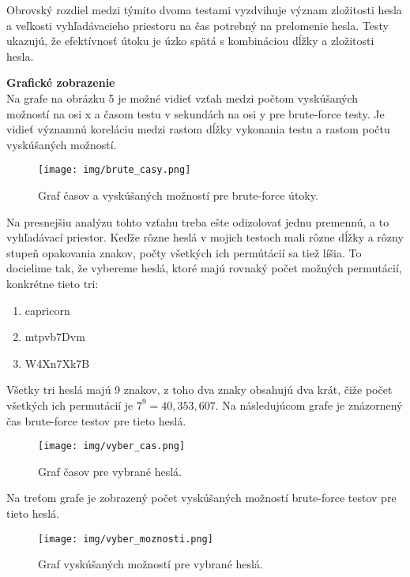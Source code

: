 \documentclass[12pt, twoside]{book}
\newcommand{\subsubsubsection}[1]{%
  \textbf{#1} \\ 
}
\begin{document}
Obrovský rozdiel medzi týmito dvoma testami vyzdvihuje význam zložitosti hesla a veľkosti vyhľadávacieho priestoru na čas potrebný na prelomenie hesla. Testy ukazujú, že efektívnosť útoku je úzko spätá s kombináciou dĺžky a zložitosti hesla. 

\subsubsubsection{Grafické zobrazenie}
Na grafe na obrázku 5 je možné vidieť vzťah medzi počtom vyskúšaných možností na osi x a časom testu v sekundách na osi y pre brute-force testy. Je vidieť významnú koreláciu medzi rastom dĺžky vykonania testu a rastom počtu vyskúšaných možností.

\begin{figure}[H] 
    \centering
    \texttt{[image: img/brute\_casy.png]}
    \caption{Graf časov a vyskúšaných možností pre brute-force útoky.}
    \label{fig:brute_casy}
\end{figure}

Na presnejšiu analýzu tohto vzťahu treba ešte odizolovať jednu premennú, a to vyhľadávací priestor. Keďže rôzne heslá v mojich testoch mali rôzne dĺžky a rôzny stupeň opakovania znakov, počty všetkých ich permútácií sa tiež líšia. To docielime tak, že vybereme heslá, ktoré majú rovnaký počet možných permutácií, konkrétne tieto tri: 

\begin{enumerate}
    \item capricorn
    \item mtpvb7Dvm
    \item W4Xn7Xk7B
\end{enumerate}

Všetky tri heslá majú 9 znakov, z toho dva znaky obsahujú dva krát, čiže počet všetkých ich permutácií je $7^9 = 40,353,607$. Na následujúcom grafe je znázornený čas brute-force testov pre tieto heslá.

\begin{figure}[H] 
    \centering
    \texttt{[image: img/vyber\_cas.png]}
    \caption{Graf časov pre vybrané heslá.}
    \label{fig:vyber_cas}
\end{figure}

Na treťom grafe je zobrazený počet vyskúšaných možností brute-force testov pre tieto heslá.  

\begin{figure}[H] 
    \centering
    \texttt{[image: img/vyber\_moznosti.png]}
    \caption{Graf vyskúšaných možností pre vybrané heslá.}
    \label{fig:vyber_moznosti}
\end{figure}
\end{document}
